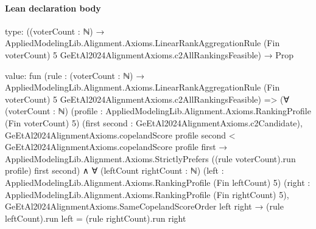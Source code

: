 \documentclass[10pt]{article}
\begin{document}
\paragraph{Lean declaration body}
\begin{ReviewVerbatim}
type:
((voterCount : ℕ) →
    AppliedModelingLib.Alignment.Axioms.LinearRankAggregationRule (Fin voterCount) 5
      GeEtAl2024AlignmentAxioms.c2AllRankingsFeasible) →
  Prop

value:
fun
    (rule :
      (voterCount : ℕ) →
        AppliedModelingLib.Alignment.Axioms.LinearRankAggregationRule (Fin voterCount) 5
          GeEtAl2024AlignmentAxioms.c2AllRankingsFeasible) =>
  (∀ (voterCount : ℕ) (profile : AppliedModelingLib.Alignment.Axioms.RankingProfile (Fin voterCount) 5)
      (first second : GeEtAl2024AlignmentAxioms.c2Candidate),
      GeEtAl2024AlignmentAxioms.copelandScore profile second < GeEtAl2024AlignmentAxioms.copelandScore profile first →
        AppliedModelingLib.Alignment.Axioms.StrictlyPrefers ((rule voterCount).run profile) first second) ∧
    ∀ (leftCount rightCount : ℕ) (left : AppliedModelingLib.Alignment.Axioms.RankingProfile (Fin leftCount) 5)
      (right : AppliedModelingLib.Alignment.Axioms.RankingProfile (Fin rightCount) 5),
      GeEtAl2024AlignmentAxioms.SameCopelandScoreOrder left right →
        (rule leftCount).run left = (rule rightCount).run right
\end{ReviewVerbatim}
\end{document}
